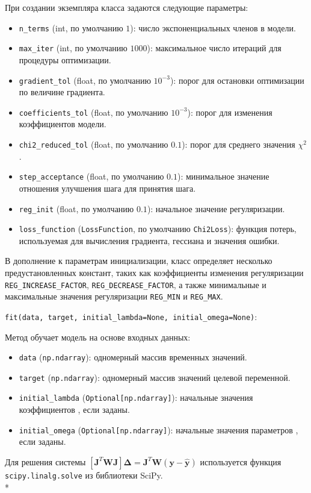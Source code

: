 При создании экземпляра класса задаются следующие параметры:
\begin{itemize}
	\item \texttt{n\_terms} (int, по умолчанию $1$): число экспоненциальных членов в модели.
	\item \texttt{max\_iter} (int, по умолчанию $1000$): максимальное число итераций для процедуры оптимизации.
	\item \texttt{gradient\_tol} (float, по умолчанию $10^{-3}$): порог для остановки оптимизации по величине градиента.
	\item \texttt{coefficients\_tol} (float, по умолчанию $10^{-3}$): порог для изменения коэффициентов модели.
	\item \texttt{chi2\_reduced\_tol} (float, по умолчанию $0.1$): порог для среднего значения $\chi^2$.
	\item \texttt{step\_acceptance} (float, по умолчанию $0.1$): минимальное значение отношения улучшения шага для принятия шага.
	\item \texttt{reg\_init} (float, по умолчанию $0.1$): начальное значение регуляризации.
	\item \texttt{loss\_function} (\texttt{LossFunction}, по умолчанию \texttt{Chi2Loss}): функция потерь, используемая для вычисления градиента, гессиана и значения ошибки.
\end{itemize}

В дополнение к параметрам инициализации, класс определяет несколько предустановленных констант, таких как коэффициенты изменения регуляризации \texttt{REG\_INCREASE\_FACTOR}, \texttt{REG\_DECREASE\_FACTOR}, а также минимальные и максимальные значения регуляризации \texttt{REG\_MIN} и \texttt{REG\_MAX}.

\texttt{fit(data, target, initial\_lambda=None, \linebreak initial\_omega=None)}:

Метод обучает модель на основе входных данных:
\begin{itemize}
	\item \texttt{data} (\texttt{np.ndarray}): одномерный массив временных значений.
	\item \texttt{target} (\texttt{np.ndarray}): одномерный массив значений целевой переменной.
	\item \texttt{initial\_lambda} (\texttt{Optional[np.ndarray]}): начальные значения коэффициентов , если заданы.
	\item \texttt{initial\_omega} (\texttt{Optional[np.ndarray]}): начальные значения параметров , если заданы.
\end{itemize}
Для решения системы $[\mathbf{J}^T\mathbf{W}\mathbf{J}]\boldsymbol{\Delta}=\mathbf{J}^T\mathbf{W}(\mathbf{y}-\mathbf{\hat{y}})$ используется функция \linebreak \texttt{scipy.linalg.solve} из библиотеки SciPy.
\\*

